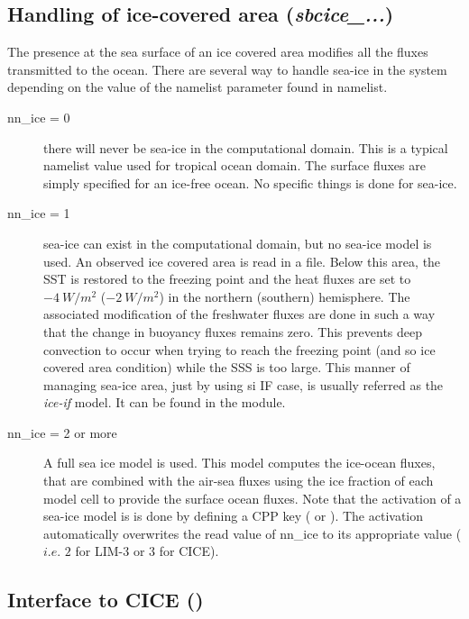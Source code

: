 \documentclass[../tex_main/NEMO_manual]{subfiles}
\begin{document}
\subsection{Handling of ice-covered area  (\textit{sbcice\_...})}
\label{subsec:SBC_ice-cover}

The presence at the sea surface of an ice covered area modifies all the fluxes transmitted to the ocean.
There are several way to handle sea-ice in the system depending on
the value of the  namelist parameter found in  namelist.
\begin{description}
\item[nn{\_}ice = 0]
  there will never be sea-ice in the computational domain.
  This is a typical namelist value used for tropical ocean domain.
  The surface fluxes are simply specified for an ice-free ocean.
  No specific things is done for sea-ice.
\item[nn{\_}ice = 1]
  sea-ice can exist in the computational domain, but no sea-ice model is used.
  An observed ice covered area is read in a file.
  Below this area, the SST is restored to the freezing point and
  the heat fluxes are set to $-4~W/m^2$ ($-2~W/m^2$) in the northern (southern) hemisphere.
  The associated modification of the freshwater fluxes are done in such a way that
  the change in buoyancy fluxes remains zero.
  This prevents deep convection to occur when trying to reach the freezing point
  (and so ice covered area condition) while the SSS is too large.
  This manner of managing sea-ice area, just by using si IF case,
  is usually referred as the \textit{ice-if} model.
  It can be found in the  module.
\item[nn{\_}ice = 2 or more]
  A full sea ice model is used.
  This model computes the ice-ocean fluxes,
  that are combined with the air-sea fluxes using the ice fraction of each model cell to
  provide the surface ocean fluxes.
  Note that the activation of a sea-ice model is is done by defining a CPP key ( or ).
  The activation automatically overwrites the read value of nn{\_}ice to its appropriate value
  ($i.e.$ $2$ for LIM-3 or $3$ for CICE).
\end{description}


\subsection{Interface to CICE (\protect{})}
\label{subsec:SBC_cice}
\end{document}
